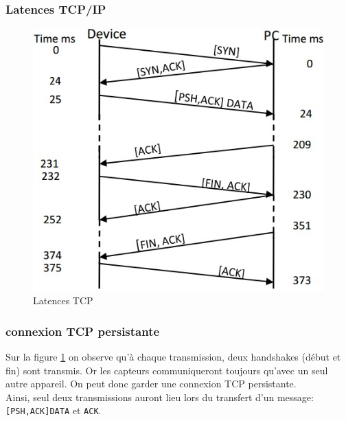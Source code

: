 \begin{frame}
 \frametitle{Latences TCP/IP}
 \begin{figure}
  \centering
  \includegraphics[scale=0.5]{figures/TCPlatences.jpg}
  \caption{Latences TCP}
  \label{tcplatences}
 \end{figure}
\end{frame}
\begin{frame}
 \frametitle{connexion TCP persistante}
 Sur la figure \ref{tcplatences} on observe qu'à chaque transmission, deux handshakes (début et fin) sont transmis. Or les capteurs communiqueront toujours qu'avec un seul autre appareil.
 On peut donc garder une connexion TCP persistante.\\
 \vspace{5mm}
 Ainsi, seul deux transmissions auront lieu lors du transfert d'un message: \texttt{[PSH,ACK]DATA} et \texttt{ACK}.
\end{frame}
